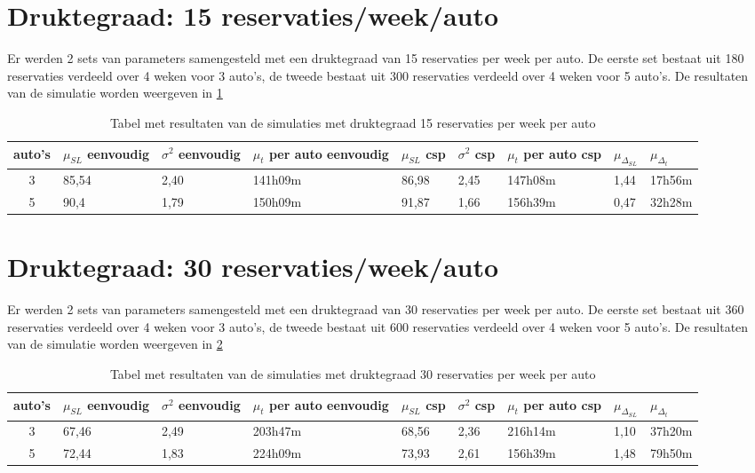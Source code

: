 \section{Druktegraad: 15 reservaties/week/auto}
Er werden 2 sets van parameters samengesteld met een druktegraad van 15 reservaties per week per auto. 
De eerste set bestaat uit 180 reservaties verdeeld over 4 weken voor 3 auto's, de tweede bestaat uit 300 reservaties verdeeld over 4 weken voor 5 auto's. 
De resultaten van de simulatie worden weergeven in \ref{tab:resultaten15}
\begin{table}[h]
	\centering
	\begin{tabular}{ | c | p{1.5cm} | p{1.5cm} | p{1.5cm} | p{1.5cm} | p{1.5cm} | p{1.5cm} | p{1.5cm} | p{1.5cm} |}
		\hline
		auto's & $\mu_{ SL}$ eenvoudig & $\sigma^2$ eenvoudig & $\mu_{ t}$ per auto eenvoudig & $\mu_{ SL}$ csp & $\sigma^2$ csp & $\mu_{ t}$ per auto csp & $\mu_{\Delta_{ SL}}$ & $\mu_{\Delta_{ t}}$ \\ \hline
		3 & 85,54 & 2,40 & 141h09m & 86,98 & 2,45 & 147h08m & 1,44 & 17h56m  \\ \hline
		5 & 90,4 & 1,79 & 150h09m & 91,87 & 1,66 & 156h39m & 0,47 & 32h28m \\ \hline
	\end{tabular}
	\caption{Tabel met resultaten van de simulaties met druktegraad 15 reservaties per week per auto}
	\label{tab:resultaten15}
\end{table}
\section{Druktegraad: 30 reservaties/week/auto}
Er werden 2 sets van parameters samengesteld met een druktegraad van 30 reservaties per week per auto. 
De eerste set bestaat uit 360 reservaties verdeeld over 4 weken voor 3 auto's, de tweede bestaat uit 600 reservaties verdeeld over 4 weken voor 5 auto's. 
De resultaten van de simulatie worden weergeven in \ref{tab:resultaten30}
\begin{table}[h]
	\centering
	\begin{tabular}{ | c | p{1.5cm} | p{1.5cm} | p{1.5cm} | p{1.5cm} | p{1.5cm} | p{1.5cm} | p{1.5cm} | p{1.5cm} |}
		\hline
		auto's & $\mu_{ SL}$ eenvoudig & $\sigma^2$ eenvoudig & $\mu_{ t}$ per auto eenvoudig & $\mu_{ SL}$ csp & $\sigma^2$ csp & $\mu_{ t}$ per auto csp & $\mu_{\Delta_{ SL}}$ & $\mu_{\Delta_{ t}}$ \\ \hline
		3 & 67,46 & 2,49 & 203h47m & 68,56 & 2,36 & 216h14m & 1,10 & 37h20m  \\ \hline
		5 & 72,44 & 1,83 & 224h09m & 73,93 & 2,61 & 156h39m & 1,48 & 79h50m \\ \hline
	\end{tabular}
	\caption{Tabel met resultaten van de simulaties met druktegraad 30 reservaties per week per auto}
	\label{tab:resultaten30}
\end{table}

